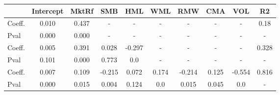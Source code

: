 \begin{tabular}{lccccccccc}
\toprule
{} &  Intercept &  MktRf &    SMB &    HML &    WML &    RMW &    CMA &    VOL &     R2 \\
\midrule
Coeff.  &      0.010 &  0.437 &      - &      - &      - &      - &      - &      - &   0.18 \\
Pval    &      0.000 &  0.000 &      - &      - &      - &      - &      - &      - &      - \\
Coeff.  &      0.005 &  0.391 &  0.028 & -0.297 &      - &      - &      - &      - &  0.328 \\
Pval    &      0.101 &  0.000 &  0.773 &    0.0 &      - &      - &      - &      - &      - \\
Coeff.  &      0.007 &  0.109 & -0.215 &  0.072 &  0.174 & -0.214 &  0.125 & -0.554 &  0.816 \\
Pval    &      0.000 &  0.015 &  0.004 &  0.124 &    0.0 &  0.015 &  0.045 &    0.0 &      - \\
\bottomrule
\end{tabular}
